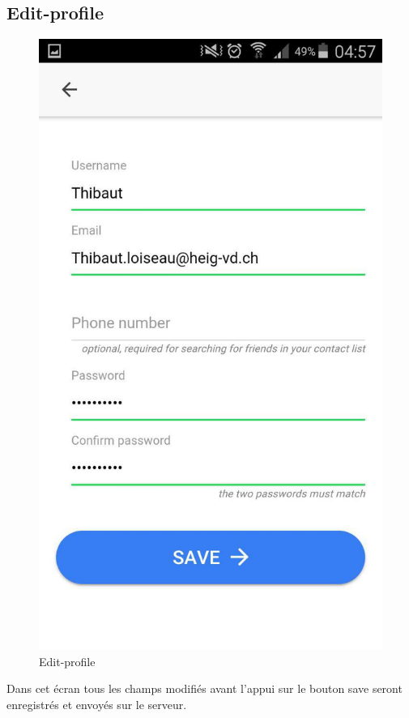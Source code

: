 \documentclass[french]{article}
\begin{document}
	\subsection{Edit-profile}
		\begin{figure}[H]
			\centering
			\includegraphics[scale=0.4]{../screenshot/screenshot-edit-profile}
			\caption{Edit-profile}
			\label{Edit-profile}
		\end{figure} 
	Dans cet écran tous les champs modifiés avant l'appui sur le bouton save seront enregistrés et envoyés sur le serveur.
\end{document}
